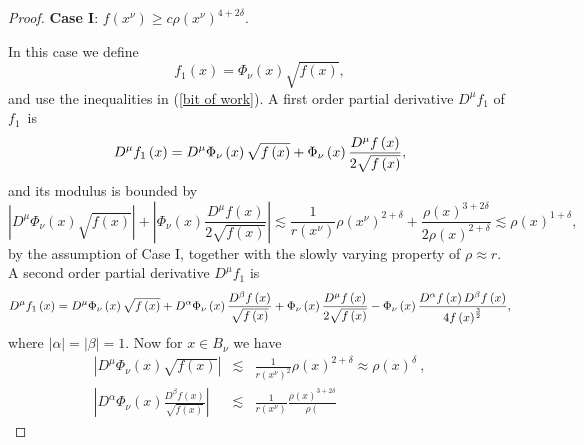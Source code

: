 \documentclass{amsart}
\theoremstyle{plain}
\numberwithin{equation}{section}
\begin{document}
\begin{proof}
\textbf{Case I}: $f\left( x^{\nu }\right) \geq c\rho \left( x^{\nu }\right)
^{4+2\delta }$.

\medskip

In this case we define 
\begin{equation*}
f_{1}\left( x\right) =\Phi _{\nu }\left( x\right) \sqrt{f\left( x\right) },
\end{equation*}%
and use the inequalities in (\ref{bit of work}). A first order partial
derivative $D^{\mu }f_{1}$ of $f_{1}$\ is%
\begin{equation*}
D^{\mu }f_{1}\left( x\right) =D^{\mu }\Phi _{\nu }\left( x\right) \sqrt{%
f\left( x\right) }+\Phi _{\nu }\left( x\right) \frac{D^{\mu }f\left(
x\right) }{2\sqrt{f\left( x\right) }},
\end{equation*}%
and its modulus is bounded by%
\begin{equation*}
\left\vert D^{\mu }\Phi _{\nu }\left( x\right) \sqrt{f\left( x\right) }%
\right\vert +\left\vert \Phi _{\nu }\left( x\right) \frac{D^{\mu }f\left(
x\right) }{2\sqrt{f\left( x\right) }}\right\vert \lesssim \frac{1}{r\left(
x^{\nu }\right) }\rho \left( x^{\nu }\right) ^{2+\delta }+\frac{\rho \left(
x\right) ^{3+2\delta }}{2\rho \left( x\right) ^{2+\delta }}\lesssim \rho
\left( x\right) ^{1+\delta },
\end{equation*}%
by the assumption of Case I, together with the slowly varying property of $%
\rho \approx r$. A second order partial derivative $D^{\mu }f_{1}$ is%
\begin{equation*}
D^{\mu }f_{1}\left( x\right) =D^{\mu }\Phi _{\nu }\left( x\right) \sqrt{%
f\left( x\right) }+D^{\alpha }\Phi _{\nu }\left( x\right) \frac{D^{\beta
}f\left( x\right) }{\sqrt{f\left( x\right) }}+\Phi _{\nu }\left( x\right) 
\frac{D^{\mu }f\left( x\right) }{2\sqrt{f\left( x\right) }}-\Phi _{\nu
}\left( x\right) \frac{D^{\alpha }f\left( x\right) D^{\beta }f\left(
x\right) }{4f\left( x\right) ^{\frac{3}{2}}},
\end{equation*}%
where $\left\vert \alpha \right\vert =\left\vert \beta \right\vert =1$. Now
for $x\in B_{\nu }$ we have%
\begin{eqnarray*}
\left\vert D^{\mu }\Phi _{\nu }\left( x\right) \sqrt{f\left( x\right) }%
\right\vert &\lesssim &\frac{1}{r\left( x^{\nu }\right) ^{2}}\rho \left(
x\right) ^{2+\delta }\approx \rho \left( x\right) ^{\delta }\ , \\
\left\vert D^{\alpha }\Phi _{\nu }\left( x\right) \frac{D^{\beta }f\left(
x\right) }{\sqrt{f\left( x\right) }}\right\vert &\lesssim &\frac{1}{r\left(
x^{\nu }\right) }\frac{\rho \left( x\right) ^{3+2\delta }}{\rho \left(
}
\end{eqnarray*}
\end{proof}
\end{document}

